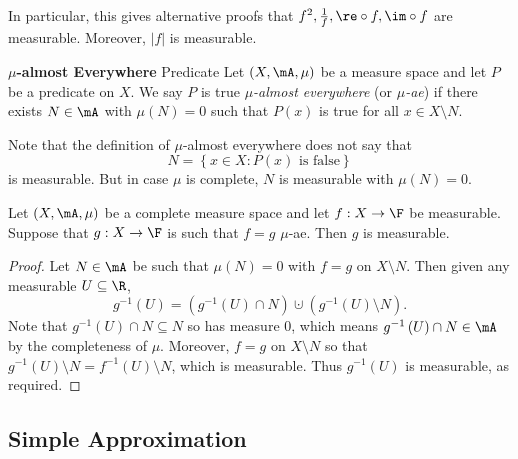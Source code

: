 \documentclass[pmath451]{subfiles}
\begin{document}
    In particular, this gives alternative proofs that $f^{2}, \frac{1}{f}, \re\circ f, \im\circ f$ are measurable. Moreover, $\left| f \right|$ is measurable.
    
    \begin{definition}{\textbf{$\mu$-almost Everywhere} Predicate}
        Let $\left( X,\mA,\mu \right)$ be a measure space and let $P$ be a predicate on $X$. We say $P$ is true \emph{$\mu$-almost everywhere} (or \emph{$\mu$-ae}) if there exists $N\in\mA$ with $\mu\left( N \right) = 0$ such that $P\left( x \right)$ is true for all $x\in X\setminus N$.
    \end{definition}
    
    \np Note that the definition of $\mu$-almost everywhere does not say that
    \begin{equation*}
        N = \left\lbrace x\in X: \text{$P\left( x \right)$ is false} \right\rbrace
    \end{equation*}
    is measurable. But in case $\mu$ is complete, $N$ is measurable with $\mu\left( N \right) = 0$.

    \begin{prop}{}
        Let $\left( X,\mA,\mu \right)$ be a complete measure space and let $f:X\to\F$ be measurable. Suppose that $g:X\to\F$ is such that $f=g$ $\mu$-ae. Then $g$ is measurable.
    \end{prop}

    \begin{proof}
        Let $N\in\mA$ be such that $\mu\left( N \right) = 0$ with $f=g$ on $X\setminus N$. Then given any measurable $U\subseteq\R$,
        \begin{equation*}
            g^{-1}\left( U \right) = \left( g^{-1}\left( U \right)\cap N \right) \cupdot \left( g^{-1}\left( U \right)\setminus N \right).
        \end{equation*}
        Note that $g^{-1}\left( U \right)\cap N\subseteq N$ so has measure $0$, which means $g^{-1}\left( U \right)\cap N\in\mA$ by the completeness of $\mu$. Moreover, $f=g$ on $X\setminus N$ so that $g^{-1}\left( U \right)\setminus N = f^{-1}\left( U \right)\setminus N$, which is measurable. Thus $g^{-1}\left( U \right)$ is measurable, as required.
    \end{proof}
    
    \clearpage

    \subsection{Simple Approximation}
    
\end{document}
